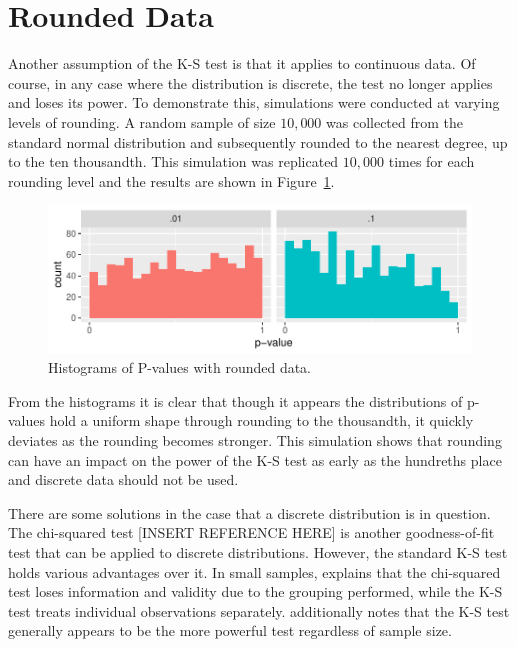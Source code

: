 \documentclass[12pt, letterpaper, titlepage]{article}
\begin{document}
\hypertarget{sec:rounded}{%
\section{Rounded Data}\label{sec:rounded}}

Another assumption of the K-S test is that it applies to continuous data. Of course, in any case where the distribution is discrete, the test no longer applies and loses its power. To demonstrate this, simulations were conducted at varying levels of rounding. A random sample of size $10,000$ was collected from the standard normal distribution and subsequently rounded to the nearest degree, up to the ten thousandth. This simulation was replicated $10,000$ times for each rounding level and the results are shown in Figure~\ref{fig:hist_rounded}.

\begin{figure}[!ht]
  \centering
  \includegraphics[width=0.8\linewidth]{hist_rounded}
  \caption{Histograms of P-values with rounded data.}
  \label{fig:hist_rounded}
\end{figure}

From the histograms it is clear that though it appears the distributions of p-values hold a uniform shape through rounding to the thousandth, it quickly deviates as the rounding becomes stronger. This simulation shows that rounding can have an impact on the power of the K-S test as early as the hundreths place and discrete data should not be used.

There are some solutions in the case that a discrete distribution is in question. The chi-squared test [INSERT REFERENCE HERE] is another goodness-of-fit test that can be applied to discrete distributions. However, the standard K-S test holds various advantages over it. In small samples, \citet{Massey} explains that the chi-squared test loses information and validity due to the grouping performed, while the K-S test treats individual observations separately. \citet{Massey} additionally notes that the K-S test generally appears to be the more powerful test regardless of sample size.
\end{document}
